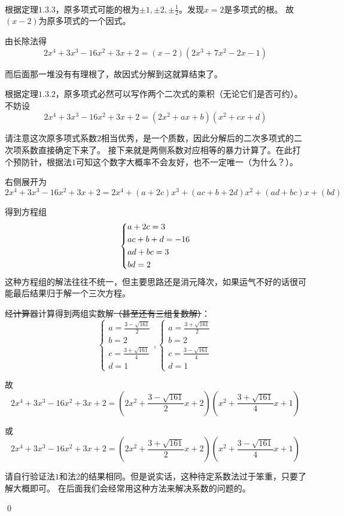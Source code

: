 \begin{jie}
\ 
\begin{way1}
    根据定理$1.3.3$，原多项式可能的根为$\pm1,\pm2,\pm\frac{1}{2}$。发现$x=2$是多项式的根。
    故$(x-2)$为原多项式的一个因式。
    
    由长除法得\[2x^4+3x^3-16x^2+3x+2=(x-2)(2x^3+7x^2-2x-1)\]
    
    而后面那一堆没有有理根了，故因式分解到这就算结束了。
\end{way1}
\begin{way2}
    根据定理$1.3.2$，原多项式必然可以写作两个二次式的乘积（无论它们是否可约）。
    不妨设\[2x^4+3x^3-16x^2+3x+2=(2x^2+ax+b)(x^2+cx+d)\]
    
    请注意这次原多项式系数$2$相当优秀，是一个质数，因此分解后的二次多项式的二次项系数直接确定下来了。
    接下来就是两侧系数对应相等的暴力计算了。在此打个预防针，根据法$1$可知这个数字大概率不会友好，也不一定唯一（为什么？）。

    右侧展开为
    \[2x^4+3x^3-16x^2+3x+2=2x^4+(a+2c)x^3+(ac+b+2d)x^2+(ad+bc)x+(bd)\]
    
    得到方程组
    \[  
    \left\{
    \begin{lgathered}
    a+2c=3\\
    ac+b+d=-16\\
    ad+bc=3\\
    bd=2
    \end{lgathered}
    \right.
    \]
    这种方程组的解法往往不统一，但主要思路还是消元降次，如果运气不好的话很可能最后结果归于解一个三次方程。
    
    经\sout{计算器}计算得到两组实数解\sout{（甚至还有三组复数解）}：
    \begin{equation*}
    \left\{
    {
    \begin{array}{*{20}{c}}
        {a=\frac{3-\sqrt{161}}{2}}\\ 
        {b=2\ \ \ \ \ \ \ }\\  
        {c=\frac{3+\sqrt{161}}{4}}\\
        {d=1\ \ \ \ \ \ \ }
    \end{array}
    }
    \right.,
    \left\{
    {
    \begin{array}{*{20}{c}}
        {a=\frac{3+\sqrt{161}}{2}}\\  
        {b=2\ \ \ \ \ \ \ }\\
        {c=\frac{3-\sqrt{161}}{4}}\\
        {d=1\ \ \ \ \ \ \ }
    \end{array}
    }
    \right.    
    \end{equation*}

    故\[2x^4+3x^3-16x^2+3x+2=(2x^2+\frac{3-\sqrt{161}}{2}x+2)(x^2+\frac{3+\sqrt{161}}{4}x+1)\]

    或\[2x^4+3x^3-16x^2+3x+2=(2x^2+\frac{3+\sqrt{161}}{2}x+2)(x^2+\frac{3-\sqrt{161}}{4}x+1)\]
\end{way2}
    请自行验证法$1$和法$2$的结果相同。但是说实话，这种待定系数法过于笨重，只要了解大概即可。
    在后面我们会经常用这种方法来解决系数的问题的。

    \qed
\end{jie}

